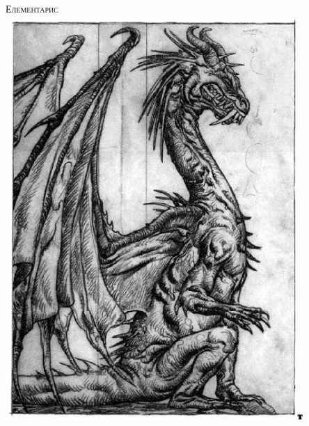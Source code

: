 \begin{titlepage}
\begin{center}

\textsc{\Huge Елементарис}\\[1.5cm]
\includegraphics[width=0.85\textwidth]{../images/dragon}~
\\[1cm]

\vfill

\date{}

\end{center}
\end{titlepage}
